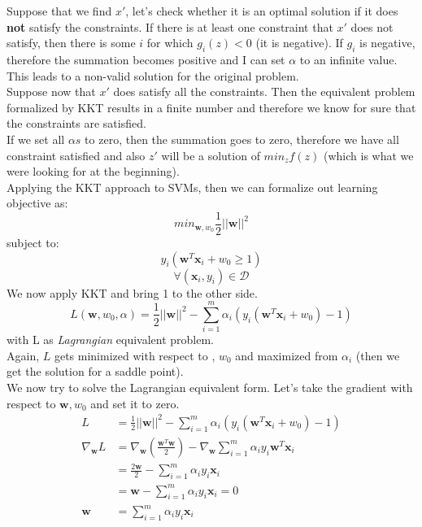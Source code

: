 Suppose that we find $x'$, let's check whether it is an optimal solution if it does
\textbf{not} satisfy the constraints. If there is at least one constraint that $x
'$ does not satisfy, then there is some $i$ for which $g_{i}(z) < 0$ (it is negative).
If $g_{i}$ is negative, therefore the summation becomes positive and I can set
$\alpha$ to an infinite value. This leads to a non-valid solution for the original
problem.\\

Suppose now that $x'$ does satisfy all the constraints. Then the equivalent problem
formalized by KKT results in a finite number and therefore we know for sure that
the constraints are satisfied.\\ If we set all $\alpha s$ to zero, then the
summation goes to zero, therefore we have all constraint satisfied and also $z'$
will be a solution of $min_{z}f(z)$ (which is what we were looking for at the
beginning).\\

Applying the KKT approach to SVMs, then we can formalize out learning objective as:
\[
	min_{\pmb{w}, w_0}\frac{1}{2}||\pmb{w}||^{2}
\]
subject to:
\[
	y_{i}(\pmb{w}^{T}\pmb{x}_{i}+ w_{0}\geq 1)
\]
\[
	\forall (\pmb{x}_{i}, y_{i}) \in \mathcal{D}
\]
We now apply KKT and bring 1 to the other side.
\begin{equation}
	L(\pmb{w}, w_{0}, \alpha) = \frac{1}{2}||\pmb{w}||^{2}- \sum_{i=1}^{m}\alpha_{i}
	(y_{i}(\pmb{w}^{T}\pmb{x}_{i}+ w_{0}) - 1) \label{eq:Lagrangian}
\end{equation}
with L as \textit{Lagrangian} equivalent problem.\\ Again, $L$ gets minimized
with respect to , $w_{0}$ and maximized from $\alpha_{i}$ (then we get the
solution for a saddle point).\\

We now try to solve the Lagrangian equivalent form. Let's take the gradient with
respect to $\pmb{w}, w_{0}$ and set it to zero.
\begin{align*}
	L                 & = \frac{1}{2}||\pmb{w}||^{2}- \sum_{i=1}^{m}\alpha_{i}(y_{i}(\pmb{w}^{T}\pmb{x}_{i}+ w_{0}) - 1)                                   \\
	\nabla_{\pmb{w}}L & = \nabla_{\pmb{w}}\left (\frac{\pmb{w}^{T}\pmb{w}}{2}\right) - \nabla_{\pmb{w}}\sum_{i=1}^{m}\alpha_{i}y_{i}\pmb{w}^{T}\pmb{x}_{i} \\
	                  & = \frac{2\pmb{w}}{2}- \sum_{i=1}^{m}\alpha_{i}y_{i}\pmb{x}_{i}                                                                     \\
	                  & =\pmb{w}- \sum_{i=1}^{m}\alpha_{i}y_{i}\pmb{x}_{i}= 0                                                                              \\
	\pmb{w}           & = \sum_{i=1}^{m}\alpha_{i}y_{i}\pmb{x}_{i}
\end{align*}

